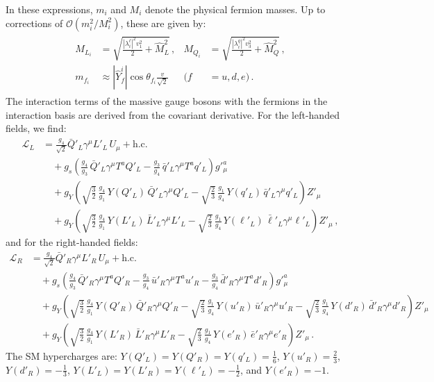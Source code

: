 In these expressions, $m_i$ and $M_i$ denote the physical fermion masses. Up to corrections of $\mathcal{O}(m_i^2 / M_i^2)$, these are given by:
\begin{align}\label{eq:ferm_masses}
\begin{aligned}
M_{L_i} &= \sqrt{\frac{|\lambda_i^\ell|^2 v_1^2}{2} + \hat M_L^2}\,, &
M_{Q_i} &= \sqrt{\frac{|\lambda_i^q|^2 v_3^2}{2} + \hat M_Q^2}\,, \\[2pt]
m_{f_i} &\approx |\hat Y_f^i| \cos\theta_{f_i} \frac{v}{\sqrt{2}} & (f &= u, d, e)\,.
\end{aligned}
\end{align}
The interaction terms of the massive gauge bosons with the fermions in the interaction basis are derived from the covariant derivative. For the left-handed fields, we find:
{\small
\begin{align}
\mathcal{L}_L &= \frac{g_4}{\sqrt{2}} \bar{Q}'_L \gamma^\mu L'_L \, U_\mu + \textrm{h.c.} \nonumber \\
&\quad + g_s \left( \frac{g_4}{g_3} \, \bar{Q}'_L \gamma^\mu T^a Q'_L - \frac{g_3}{g_4} \,\bar{q}'_L \gamma^\mu T^a q'_L \right) g'^a_\mu \nonumber \\
&\quad + g_Y \left( \sqrt{\frac{3}{2}}\,\frac{g_4}{g_1}\,Y(Q'_L) \, \bar{Q}'_L \gamma^\mu Q'_L - \sqrt{\frac{2}{3}}\,\frac{g_1}{g_4}\,Y(q'_L) \, \bar{q}'_L \gamma^\mu q'_L \right) Z'_\mu \nonumber\\
&\quad + g_Y \left( \sqrt{\frac{3}{2}}\,\frac{g_4}{g_1}\,Y(L'_L) \, \bar{L}'_L \gamma^\mu L'_L - \sqrt{\frac{2}{3}}\,\frac{g_1}{g_4}\,Y(\ell'_L) \, \bar{\ell}'_L \gamma^\mu \ell'_L \right) Z'_\mu\,,\label{eq:coupL}
\end{align}
}
and for the right-handed fields:
{\small
\begin{align}
\mathcal{L}_R &= \frac{g_4}{\sqrt{2}} \bar{Q}'_R \gamma^\mu L'_R \, U_\mu + \textrm{h.c.} \nonumber \\
&\quad + g_s \left( \frac{g_4}{g_3} \, \bar{Q}'_R \gamma^\mu T^a Q'_R - \frac{g_3}{g_4}  \,\bar{u}'_R \gamma^\mu T^a u'_R -\frac{g_3}{g_4} \,\bar{d}'_R \gamma^\mu T^a d'_R  \right) g'^a_\mu \nonumber \\
&\quad + g_Y \left( \sqrt{\frac{3}{2}}\,\frac{g_4}{g_1}\,Y(Q'_R) \,\bar{Q}'_R \gamma^\mu Q'_R - \sqrt{\frac{2}{3}}\,\frac{g_1}{g_4}\, Y(u'_R) \, \bar{u}'_R \gamma^\mu u'_R -\sqrt{\frac{2}{3}}\,\frac{g_1}{g_4}\, Y(d'_R) \, \bar{d}'_R \gamma^\mu d'_R \right) Z'_\mu \nonumber\\
&\quad + g_Y \left( \sqrt{\frac{3}{2}}\,\frac{g_4}{g_1}\,Y(L'_R) \, \bar{L}'_R \gamma^\mu L'_R - \sqrt{\frac{2}{3}}\,\frac{g_1}{g_4}\, Y(e'_R) \, \bar{e}'_R \gamma^\mu e'_R \right) Z'_\mu\,.\label{eq:coupR}
\end{align}
}
The SM hypercharges are: $Y(Q'_{L}) = Y(Q'_{R}) = Y(q'_{L}) = \tfrac{1}{6}$, $Y(u'_R) = \tfrac{2}{3}$, $Y(d'_R) = -\tfrac{1}{3}$, $Y(L'_L) = Y(L'_R) = Y(\ell'_L) = -\tfrac{1}{2}$, and $Y(e'_R) = -1$.   

